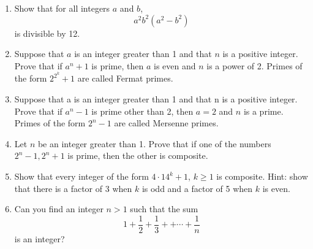 \documentclass[12pt, reqno]{amsart}
\begin{document}
\begin{enumerate}
\item Show that for all integers $a$ and $b$, 
\[
a^2b^2(a^2 - b^2)
\]
is divisible by 12.


\item Suppose that $a$ is an integer greater than 1 and that $n$ is a positive integer. Prove that if $a^n +1$ is prime, then $a$ is even and $n$ is a power of 2. Primes of the form $2^{2^k} + 1$ are called Fermat primes.

\item Suppose that a is an integer greater than 1 and that n is a positive integer. Prove that if $a^n -1$ is prime other than 2, then $a = 2$ and $n$ is a prime. Primes of the form $2^n - 1$ are called Mersenne primes.

\item Let $n$ be an integer greater than 1. Prove that if one of the numbers $2^n - 1, 2^n + 1$ is prime, then the other is composite.

\item Show that every integer of the form $4\cdot 14^k+1$, $k\geq1$ is composite. Hint: show that there is a factor of 3 when $k$ is odd and a factor of 5 when $k$ is even.

\vspace{15pt}

\item Can you find an integer $n > 1$ such that the sum
$$1 + \frac{1}{2}+ \frac{1}{3}+ + \cdots + \frac{1}{n}$$
 is an integer?

\end{enumerate}
\end{document}
